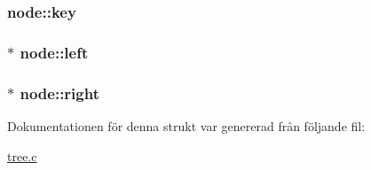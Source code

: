 \subsubsection[{\texorpdfstring{key}{key}}]{ node\+::key}\hypertarget{structnode_aa6b692707ee43532d0437efb6f060dfd}{}\label{structnode_aa6b692707ee43532d0437efb6f060dfd}
\subsubsection[{\texorpdfstring{left}{left}}]{$\ast$ node\+::left}\hypertarget{structnode_aacd557e63e1f9dca9048ed58bb3dbb2c}{}\label{structnode_aacd557e63e1f9dca9048ed58bb3dbb2c}
\subsubsection[{\texorpdfstring{right}{right}}]{$\ast$ node\+::right}\hypertarget{structnode_a8ab67b704953f3699d566a1a5d6047ad}{}\label{structnode_a8ab67b704953f3699d566a1a5d6047ad}


Dokumentationen för denna strukt var genererad från följande fil\+:\begin{DoxyCompactItemize}
\item 
\hyperlink{tree_8c}{tree.\+c}\end{DoxyCompactItemize}
